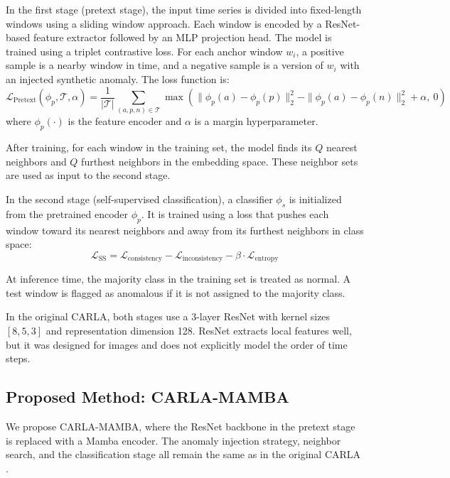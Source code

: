 \documentclass{svproc}
\begin{document}
In the first stage (pretext stage), the input time series is divided into fixed-length windows using a sliding window approach. Each window is encoded by a ResNet-based feature extractor followed by an MLP projection head. The model is trained using a triplet contrastive loss. For each anchor window $w_i$, a positive sample is a nearby window in time, and a negative sample is a version of $w_i$ with an injected synthetic anomaly. The loss function is:
\begin{equation}
\mathcal{L}_{\text{Pretext}}(\phi_p, \mathcal{T}, \alpha) = \frac{1}{|\mathcal{T}|} \sum_{(a,p,n) \in \mathcal{T}} \max(\|\phi_p(a) - \phi_p(p)\|_2^2 - \|\phi_p(a) - \phi_p(n)\|_2^2 + \alpha,\ 0)
\end{equation}
where $\phi_p(\cdot)$ is the feature encoder and $\alpha$ is a margin hyperparameter.

After training, for each window in the training set, the model finds its $Q$ nearest neighbors and $Q$ furthest neighbors in the embedding space. These neighbor sets are used as input to the second stage.

In the second stage (self-supervised classification), a classifier $\phi_s$ is initialized from the pretrained encoder $\phi_p$. It is trained using a loss that pushes each window toward its nearest neighbors and away from its furthest neighbors in class space:
\begin{equation}
\mathcal{L}_{\text{SS}} = \mathcal{L}_{\text{consistency}} - \mathcal{L}_{\text{inconsistency}} - \beta \cdot \mathcal{L}_{\text{entropy}}
\end{equation}

At inference time, the majority class in the training set is treated as normal. A test window is flagged as anomalous if it is not assigned to the majority class.

In the original CARLA, both stages use a 3-layer ResNet with kernel sizes $[8, 5, 3]$ and representation dimension 128. ResNet extracts local features well, but it was designed for images and does not explicitly model the order of time steps.

\subsection{Proposed Method: CARLA-MAMBA}

We propose CARLA-MAMBA, where the ResNet backbone in the pretext stage is replaced with a Mamba encoder. The anomaly injection strategy, neighbor search, and the classification stage all remain the same as in the original CARLA \cite{darban2024carla}.
\end{document}

